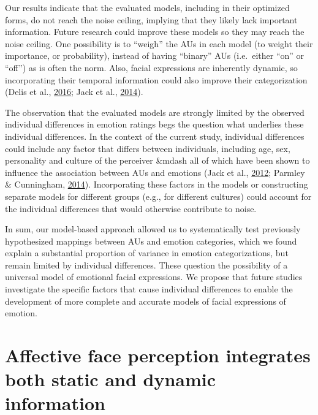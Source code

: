 \documentclass[12pt,american,a4paper,oneside,]{memoir} %
\begin{document}
Our results indicate that the evaluated models, including in their optimized forms, do not reach the noise ceiling, implying that they likely lack important information. Future research could improve these models so they may reach the noise ceiling. One possibility is to ``weigh'' the AUs in each model (to weight their importance, or probability), instead of having ``binary'' AUs (i.e.~either ``on'' or ``off'') as is often the norm. Also, facial expressions are inherently dynamic, so incorporating their temporal information could also improve their categorization (Delis et al., \protect\hyperlink{ref-Delis2016-zl}{2016}; Jack et al., \protect\hyperlink{ref-Jack2014-ku}{2014}).

The observation that the evaluated models are strongly limited by the observed individual differences in emotion ratings begs the question what underlies these individual differences. In the context of the current study, individual differences could include any factor that differs between individuals, including age, sex, personality and culture of the perceiver \&mdash all of which have been shown to influence the association between AUs and emotions (Jack et al., \protect\hyperlink{ref-Jack2012-eq}{2012}; Parmley \& Cunningham, \protect\hyperlink{ref-Parmley2014-nj}{2014}). Incorporating these factors in the models or constructing separate models for different groups (e.g., for different cultures) could account for the individual differences that would otherwise contribute to noise.

In sum, our model-based approach allowed us to systematically test previously hypothesized mappings between AUs and emotion categories, which we found explain a substantial proportion of variance in emotion categorizations, but remain limited by individual differences. These question the possibility of a universal model of emotional facial expressions. We propose that future studies investigate the specific factors that cause individual differences to enable the development of more complete and accurate models of facial expressions of emotion.

\hypertarget{static-vs-dynamic}{%
\chapter{Affective face perception integrates both static and dynamic information}\label{static-vs-dynamic}}


\vspace*{\fill}
\end{document}

